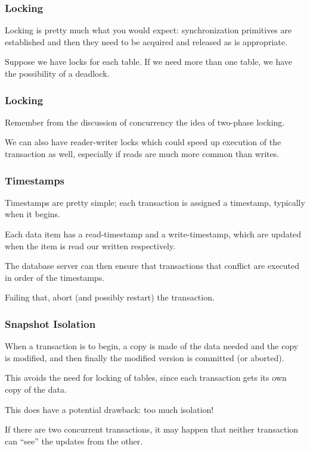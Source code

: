 \begin{frame}
\frametitle{Locking}

Locking is pretty much what you would expect: synchronization primitives are established and then they need to be acquired and released as is appropriate.

Suppose we have locks for each table. If we need more than one table, we have the possibility of a deadlock. 

\end{frame}

\begin{frame}
\frametitle{Locking}

Remember from the discussion of concurrency the idea of two-phase locking. 


We can also have reader-writer locks which could speed up execution of the transaction as well, especially if reads are much more common than writes.

\end{frame}

\begin{frame}
\frametitle{Timestamps}

Timestamps are pretty simple; each transaction is assigned a timestamp, typically when it begins. 

Each data item has a read-timestamp and a write-timestamp, which are updated when the item is read our written respectively. 

The database server can then ensure that transactions that conflict are executed in order of the timestamps. 

Failing that, abort (and possibly restart) the transaction.


\end{frame}

\begin{frame}
\frametitle{Snapshot Isolation}
When a transaction is to begin, a copy is made of the data needed and the copy is modified, and then finally the modified version is committed (or aborted). 

This avoids the need for locking of tables, since each transaction gets its own copy of the data.

This does have a potential drawback: too much isolation! 

If there are two concurrent transactions, it may happen that neither transaction can ``see'' the updates from the other.

\end{frame}




